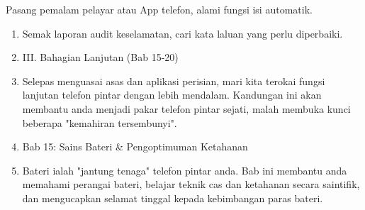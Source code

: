 \begin{tcbpractice}{Pasang pemalam pelayar atau App telefon, alami fungsi isi automatik.}
\begin{enumerate}
  \item Semak laporan audit keselamatan, cari kata laluan yang perlu diperbaiki.
  \item III. Bahagian Lanjutan (Bab 15-20)
  \item Selepas menguasai asas dan aplikasi perisian, mari kita terokai fungsi lanjutan telefon pintar dengan lebih mendalam. Kandungan ini akan membantu anda menjadi pakar telefon pintar sejati, malah membuka kunci beberapa "kemahiran tersembunyi".
  \item Bab 15: Sains Bateri \& Pengoptimuman Ketahanan
  \item Bateri ialah "jantung tenaga" telefon pintar anda. Bab ini membantu anda memahami perangai bateri, belajar teknik cas dan ketahanan secara saintifik, dan mengucapkan selamat tinggal kepada kebimbangan paras bateri.
\end{enumerate}

\end{tcbpractice}
